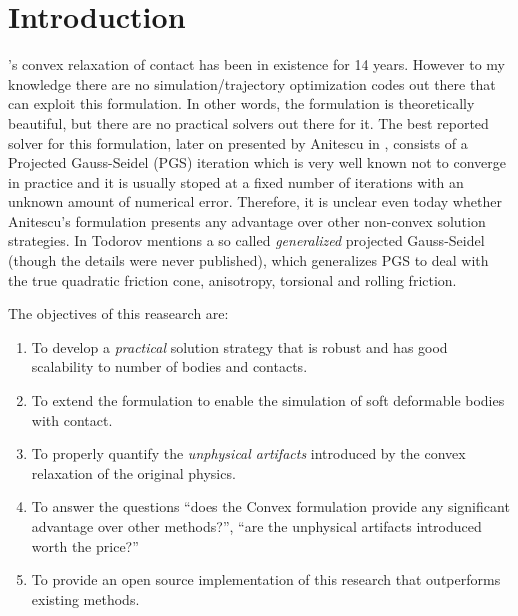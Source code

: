 % 
% 
% 

\section{Introduction}

's convex relaxation of contact
\cite{bib:anitescu2006} has been in existence for 14 years. However to my
knowledge there are no simulation/trajectory optimization codes out there that
can exploit this formulation. In other words, the formulation is theoretically
beautiful, but there are no practical solvers out there for it. The best
reported solver for this formulation, later on presented by Anitescu in
\cite{bib:anitescu2010, bib:tasora2011}, consists of a Projected Gauss-Seidel
(PGS) iteration which is very well known not to converge in practice and it is
usually stoped at a fixed number of iterations with an unknown amount of
numerical error. Therefore, it is unclear even today whether Anitescu's
formulation presents any advantage over other non-convex solution strategies. In
\cite{bib:todorov2014} Todorov mentions a so called \textit{generalized}
projected Gauss-Seidel (though the details were never published), which
generalizes PGS to deal with the true quadratic friction cone, anisotropy,
torsional and rolling friction.

The objectives of this reasearch are:
\begin{enumerate}
	\item To develop a \textit{practical} solution strategy that is robust and
	has good scalability to number of bodies and contacts.
	\item To extend the formulation to enable the simulation of soft deformable
	bodies with contact.
	\item To properly quantify the \textit{unphysical artifacts} introduced by
	the convex relaxation of the original physics.
	\item To answer the questions ``does the Convex formulation provide any
	significant advantage over other methods?'', ``are the unphysical artifacts
	introduced worth the price?''
	\item To provide an open source implementation of this research that
	outperforms existing methods.
\end{enumerate}

